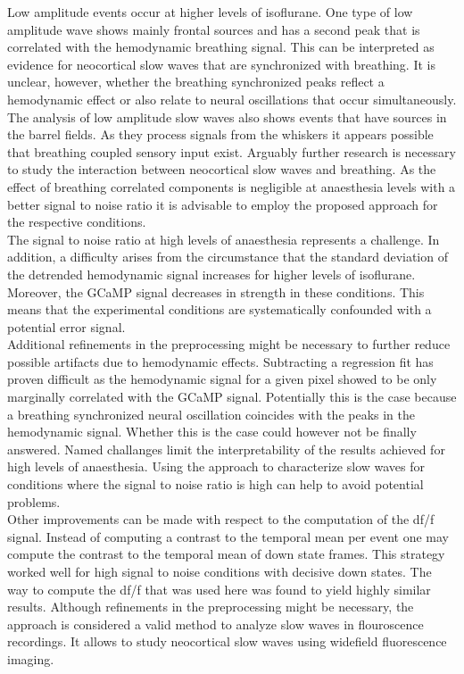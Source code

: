 Low amplitude events occur at higher levels of isoflurane. One type of low amplitude wave shows mainly frontal sources and has a second peak that is correlated with the hemodynamic breathing signal. This can be interpreted as evidence for neocortical slow waves that are synchronized with breathing. It is unclear, however, whether the breathing synchronized peaks reflect a hemodynamic effect or also relate to neural oscillations that occur simultaneously. The analysis of low amplitude slow waves also shows events that have sources in the barrel fields. As they process signals from the whiskers it appears possible that breathing coupled sensory input exist. Arguably further research is necessary to study the interaction between neocortical slow waves and breathing. As the effect of breathing correlated components is negligible at anaesthesia levels with a better signal to noise ratio it is advisable to employ the proposed approach for the respective conditions.\\
The signal to noise ratio at high levels of anaesthesia represents a challenge. In addition, a difficulty arises from the circumstance that the standard deviation of the detrended hemodynamic signal increases for higher levels of isoflurane. Moreover, the GCaMP signal decreases in strength in these conditions. This means that the experimental conditions are systematically confounded with a potential error signal.\\
Additional refinements in the preprocessing might be necessary to further reduce possible artifacts due to hemodynamic effects. Subtracting a regression fit has proven difficult as the hemodynamic signal for a given pixel showed to be only marginally correlated with the GCaMP signal. Potentially this is the case because a breathing synchronized neural oscillation coincides with the peaks in the hemodynamic signal. Whether this is the case could however not be finally answered. Named challanges limit the interpretability of the results achieved for high levels of anaesthesia. Using the approach to characterize slow waves for conditions where the signal to noise ratio is high can help to avoid potential problems.\\
Other improvements can be made with respect to the computation of the df/f signal. Instead of computing a contrast to the temporal mean per event one may compute the contrast to the temporal mean of down state frames. This strategy worked well for high signal to noise conditions with decisive down states. The way to compute the df/f that was used here was found to yield highly similar results. Although refinements in the preprocessing might be necessary, the approach is considered a valid method to analyze slow waves in flouroscence recordings. It allows to study neocortical slow waves using widefield fluorescence imaging.\\
